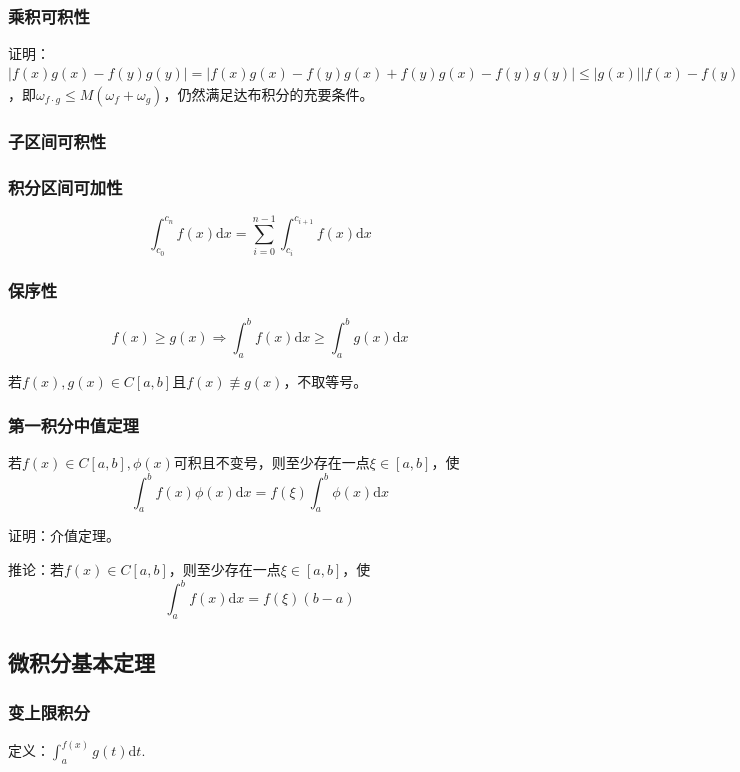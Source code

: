 \documentclass{SCIS2020cn}
\begin{document}
\subsubsection{乘积可积性}

证明：$| f ( x )g(x)-f(y)g(y)|=|f(x)g(x)-f(y)g(x)+f(y)g(x)-f(y)g(y)|\leqslant|g(x)||f(x)-f(y)|+|f(y)||g(x)-g(y)|\leqslant{}M(\omega_f+\omega_g)$，即$\omega_{f·g}\leqslant{}M(\omega_f+\omega_g)$，仍然满足达布积分的充要条件。

\subsubsection{子区间可积性}
\subsubsection{积分区间可加性}
\begin{equation}
\int_{c_0}^{c_n}{f(x)\text{d}x}=\sum_{i=0}^{n-1}{}\int_{c_i}^{c_{i+1}}{f(x)\text{d}x}
\end{equation}
\subsubsection{保序性}
\begin{equation}
f(x)\geqslant{}g(x)\Rightarrow\int_a^b{f(x)\text{d}x}\geqslant\int_a^b{g(x)\text{d}x}
\end{equation}

若$f(x),g(x)\in{}C[a,b]$且$f(x)\not\equiv{}g(x)$，不取等号。
\subsubsection{第一积分中值定理}
若$f(x)\in{}C[a,b],\phi(x)$可积且不变号，则至少存在一点$\xi\in[a,b]$，使
\begin{equation}
\int_a^b{f(x)\phi(x)\text{d}x}=f(\xi)\int_a^b{\phi(x)\text{d}x}
\end{equation}

证明：介值定理。

推论：若$f(x)\in{}C[a,b]$，则至少存在一点$\xi\in[a,b]$，使
\begin{equation}
\int_a^b{f(x)\text{d}x}=f(\xi)(b-a)
\end{equation}

\subsection{微积分基本定理}
\subsubsection{变上限积分}
定义：$\displaystyle\int_a^{f(x)}g(t)\text{d}t$.
\end{document}
